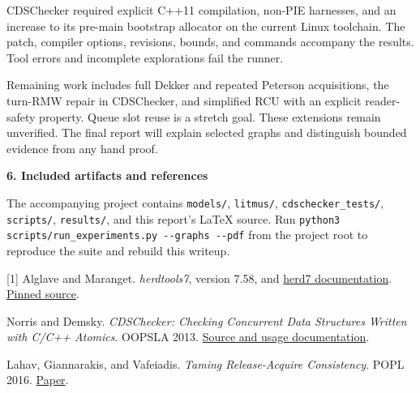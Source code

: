 \documentclass[11pt]{article}
\newcommand{\sect}[1]{\medskip\noindent\textbf{#1}\par\smallskip}
\newcommand{\code}[1]{\texttt{#1}}
\begin{document}
CDSChecker required explicit C++11 compilation, non-PIE harnesses, and an
increase to its pre-main bootstrap allocator on the current Linux toolchain.
The patch, compiler options, revisions, bounds, and commands accompany the
results. Tool errors and incomplete explorations fail the runner.

Remaining work includes full Dekker and repeated Peterson acquisitions,
the turn-RMW repair in CDSChecker, and simplified RCU with an explicit
reader-safety property. Queue slot reuse is a stretch
goal. These extensions remain unverified. The final report will explain
selected graphs and distinguish bounded evidence from any hand proof.

\sect{6. Included artifacts and references}
\small
The accompanying project contains \code{models/}, \code{litmus/},
\code{cdschecker\_tests/}, \code{scripts/}, \code{results/}, and this report's
LaTeX source. Run \code{python3 scripts/run\_experiments.py -{}-graphs -{}-pdf}
from the project root to reproduce the suite and rebuild this writeup.

\footnotesize
[1] Alglave and Maranget. \emph{herdtools7}, version 7.58, and
\href{https://diy.inria.fr/doc/herd.html}{herd7 documentation}.
\href{https://github.com/herd/herdtools7/tree/1ca343e16a2038e406d1ac674e7e3a1b722b36c7}{Pinned source}.\par
[2] Norris and Demsky. \emph{CDSChecker: Checking Concurrent Data Structures
Written with C/C++ Atomics}. OOPSLA 2013.
\href{https://github.com/computersforpeace/model-checker}{Source and usage documentation}.\par
[3] Lahav, Giannarakis, and Vafeiadis. \emph{Taming Release-Acquire Consistency}.
POPL 2016. \href{https://plv.mpi-sws.org/sra/full.pdf}{Paper}.
\end{document}
